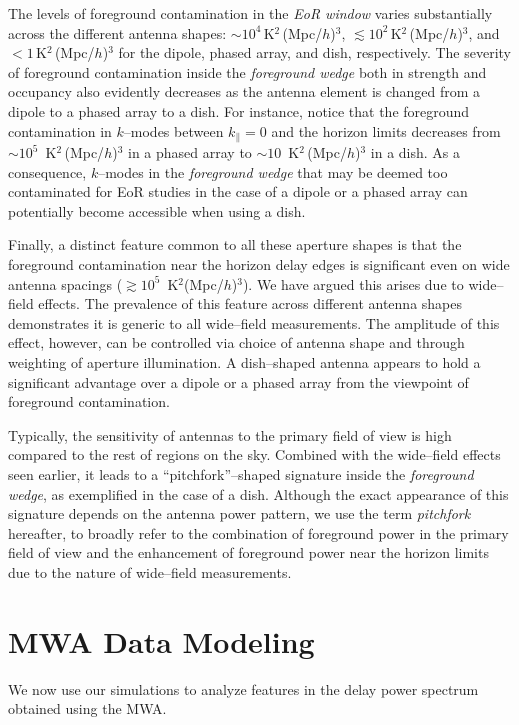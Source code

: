 \documentclass[preprint2,iop,numberedappendix]{emulateapj}
\begin{document}
The levels of foreground contamination in the {\it EoR window} varies substantially across the different antenna shapes: $\sim 10^4\,$K$^2\,$(Mpc/$h$)$^3$, $\lesssim 10^2\,$K$^2\,$(Mpc/$h$)$^3$, and $<1\,$K$^2\,$(Mpc/$h$)$^3$ for the dipole, phased array, and dish, respectively. The severity of foreground contamination inside the {\it foreground wedge} both in strength and occupancy also evidently decreases as the antenna element is changed from a dipole to a phased array to a dish. For instance, notice that the foreground contamination in $k$--modes between $k_\parallel=0$ and the horizon limits decreases from $\sim 10^5$~K$^2\,$(Mpc/$h$)$^3$ in a phased array to $\sim 10$~K$^2\,$(Mpc/$h$)$^3$ in a dish. As a consequence, $k$--modes in the {\it foreground wedge} that may be deemed too contaminated for EoR studies in the case of a dipole or a phased array can potentially become accessible when using a dish.

Finally, a distinct feature common to all these aperture shapes is that the foreground contamination near the horizon delay edges is significant even on wide antenna spacings ($\gtrsim 10^5$~K$^2$(Mpc/$h$)$^3$). We have argued this arises due to wide--field effects. The prevalence of this feature across different antenna shapes demonstrates it is generic to all wide--field measurements. The amplitude of this effect, however, can be controlled via choice of antenna shape and through weighting of aperture illumination. A dish--shaped antenna appears to hold a significant advantage over a dipole or a phased array from the viewpoint of foreground contamination. 

Typically, the sensitivity of antennas to the primary field of view is high compared to the rest of regions on the sky. Combined with the wide--field effects seen earlier, it leads to a ``pitchfork''--shaped signature inside the {\it foreground wedge}, as exemplified in the case of a dish. Although the exact appearance of this signature depends on the antenna power pattern, we use the term {\it pitchfork} hereafter, to broadly refer to the combination of foreground power in the primary field of view and the enhancement of foreground power near the horizon limits due to the nature of wide--field measurements.

\section{MWA Data Modeling}\label{sec:MWA}

We now use our simulations to analyze features in the delay power spectrum obtained using the MWA.
\end{document}
